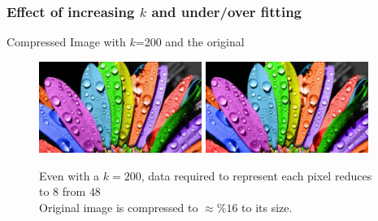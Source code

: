 \documentclass{beamer}
\begin{document}
\begin{frame}
\frametitle{Effect of increasing $k$ and under/over fitting}
\begin{center}
Compressed Image with $k$=200 and the original
\end{center}
\begin{figure}
\includegraphics[width=150pt]{flower_compressed_200.jpg}\quad
\includegraphics[width=150pt]{flower.jpg}

Even with a $k=200$, data required to represent each pixel reduces to $8$ from $48$\\
Original image is compressed to $\approx \%16$ to its size.

\end{figure}
\end{frame}
\end{document}

